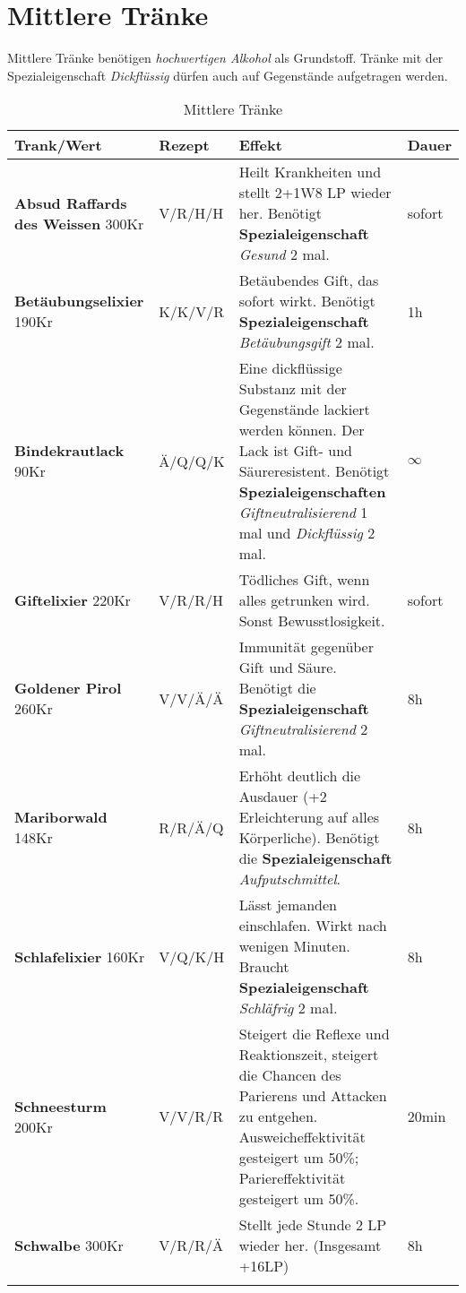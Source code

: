 \section{Mittlere Tränke}
Mittlere Tränke benötigen \textit{hochwertigen Alkohol} als Grundstoff. Tränke mit der Spezialeigenschaft \textit{Dickflüssig} dürfen auch auf Gegenstände aufgetragen werden.

\begin{longtable}{|p{3cm}|p{}|p{8cm}|p{}|}
\hline
\textbf{Trank/Wert} & \textbf{Rezept} & \textbf{Effekt} & \textbf{Dauer} \\ \hline

\textbf{Absud Raffards des Weissen} 300Kr & V/R/H/H & Heilt Krankheiten und stellt 2+1W8 LP wieder her. Benötigt \textbf{Spezialeigenschaft} \textit{Gesund} 2 mal. & sofort \\ \hline

\textbf{Betäubungselixier} 190Kr & K/K/V/R & Betäubendes Gift, das sofort wirkt. Benötigt \textbf{Spezialeigenschaft} \textit{Betäubungsgift} 2 mal. & 1h \\ \hline

\textbf{Bindekrautlack} 90Kr & Ä/Q/Q/K & Eine dickflüssige Substanz mit der Gegenstände lackiert werden können. Der Lack ist Gift- und Säureresistent. Benötigt \textbf{Spezialeigenschaften} \textit{Giftneutralisierend} 1 mal und \textit{Dickflüssig} 2 mal. & $\infty$ \\ \hline

\textbf{Giftelixier} 220Kr & V/R/R/H & Tödliches Gift, wenn alles getrunken wird. Sonst Bewusstlosigkeit. & sofort \\ \hline

\textbf{Goldener Pirol} 260Kr & V/V/Ä/Ä & Immunität gegenüber Gift und Säure. Benötigt die \textbf{Spezialeigenschaft} \textit{Giftneutralisierend} 2 mal. & 8h \\ \hline

\textbf{Mariborwald} 148Kr & R/R/Ä/Q & Erhöht deutlich die Ausdauer (+2 Erleichterung auf alles Körperliche). Benötigt die \textbf{Spezialeigenschaft} \textit{Aufputschmittel}. & 8h \\ \hline

\textbf{Schlafelixier} 160Kr & V/Q/K/H & Lässt jemanden einschlafen. Wirkt nach wenigen Minuten. Braucht \textbf{Spezialeigenschaft} \textit{Schläfrig} 2 mal. & 8h \\ \hline

\textbf{Schneesturm} 200Kr & V/V/R/R & Steigert die Reflexe und Reaktionszeit, steigert die Chancen des Parierens und Attacken zu entgehen. Ausweicheffektivität gesteigert um 50\%; Pariereffektivität gesteigert um 50\%. & 20min \\ \hline

\textbf{Schwalbe} 300Kr & V/R/R/Ä & Stellt jede Stunde 2 LP wieder her. (Insgesamt +16LP) & 8h \\ \hline

\caption{Mittlere Tränke}
\label{tab:mittlere_traenke}
\end{longtable}

